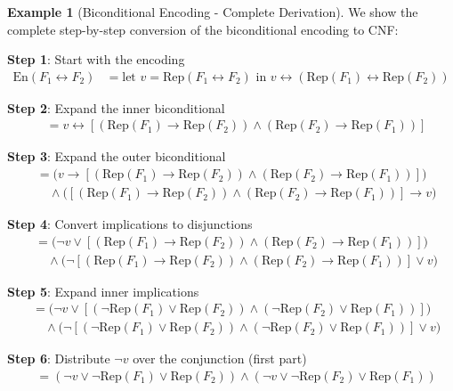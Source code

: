 \documentclass[11pt,a4paper]{article}
\theoremstyle{definition}
\newtheorem{example}{Example}[section]
\theoremstyle{plain}
\theoremstyle{remark}
\begin{document}
\begin{example}[Biconditional Encoding - Complete Derivation]
We show the complete step-by-step conversion of the biconditional encoding to CNF:

\textbf{Step 1}: Start with the encoding
\begin{align*}
\text{En}(F_1 \leftrightarrow F_2) &= \text{let } v = \text{Rep}(F_1 \leftrightarrow F_2) \text{ in } v \leftrightarrow (\text{Rep}(F_1) \leftrightarrow \text{Rep}(F_2))
\end{align*}

\textbf{Step 2}: Expand the inner biconditional
\begin{align*}
&= v \leftrightarrow [(\text{Rep}(F_1) \rightarrow \text{Rep}(F_2)) \land (\text{Rep}(F_2) \rightarrow \text{Rep}(F_1))]
\end{align*}

\textbf{Step 3}: Expand the outer biconditional
\begin{align*}
&= \big(v \rightarrow [(\text{Rep}(F_1) \rightarrow \text{Rep}(F_2)) \land (\text{Rep}(F_2) \rightarrow \text{Rep}(F_1))]\big) \\
&\quad \land \big([(\text{Rep}(F_1) \rightarrow \text{Rep}(F_2)) \land (\text{Rep}(F_2) \rightarrow \text{Rep}(F_1))] \rightarrow v\big)
\end{align*}

\textbf{Step 4}: Convert implications to disjunctions
\begin{align*}
&= \big(\neg v \lor [(\text{Rep}(F_1) \rightarrow \text{Rep}(F_2)) \land (\text{Rep}(F_2) \rightarrow \text{Rep}(F_1))]\big) \\
&\quad \land \big(\neg[(\text{Rep}(F_1) \rightarrow \text{Rep}(F_2)) \land (\text{Rep}(F_2) \rightarrow \text{Rep}(F_1))] \lor v\big)
\end{align*}

\textbf{Step 5}: Expand inner implications
\begin{align*}
&= \big(\neg v \lor [(\neg \text{Rep}(F_1) \lor \text{Rep}(F_2)) \land (\neg \text{Rep}(F_2) \lor \text{Rep}(F_1))]\big) \\
&\quad \land \big(\neg[(\neg \text{Rep}(F_1) \lor \text{Rep}(F_2)) \land (\neg \text{Rep}(F_2) \lor \text{Rep}(F_1))] \lor v\big)
\end{align*}

\textbf{Step 6}: Distribute $\neg v$ over the conjunction (first part)
\begin{align*}
&= (\neg v \lor \neg \text{Rep}(F_1) \lor \text{Rep}(F_2)) \land (\neg v \lor \neg \text{Rep}(F_2) \lor \text{Rep}(F_1))
\end{align*}


\end{example}
\end{document}
